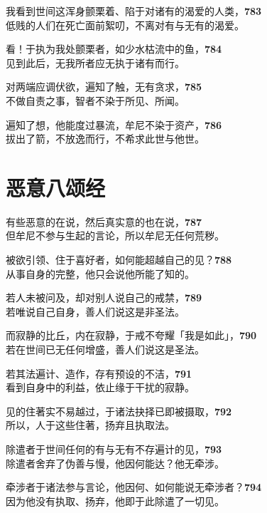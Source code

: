 我看到世间这浑身颤栗着、陷于对诸有的渴爱的人类，\hfill{\grayfootnotesize \textbf{783}} \\
低贱的人们在死亡面前絮叨，不离对有与无有的渴爱。


看！于执为我处颤栗者，如少水枯流中的鱼，\hfill{\grayfootnotesize \textbf{784}} \\
见到此后，无我所者应无执于诸有而行。


对两端应调伏欲，遍知了触，无有贪求，\hfill{\grayfootnotesize \textbf{785}} \\
不做自责之事，智者不染于所见、所闻。


遍知了想，他能度过暴流，牟尼不染于资产，\hfill{\grayfootnotesize \textbf{786}} \\
拔出了箭，不放逸而行，不希求此世与他世。


\section{恶意八颂经}

有些恶意的在说，然后真实意的也在说，\hfill{\grayfootnotesize \textbf{787}} \\
但牟尼不参与生起的言论，所以牟尼无任何荒秽。


被欲引领、住于喜好者，如何能超越自己的见？\hfill{\grayfootnotesize \textbf{788}} \\
从事自身的完整，他只会说他所能了知的。


若人未被问及，却对别人说自己的戒禁，\hfill{\grayfootnotesize \textbf{789}} \\
若唯说自己自身，善人们说这是非圣法。


而寂静的比丘，内在寂静，于戒不夸耀「我是如此」，\hfill{\grayfootnotesize \textbf{790}} \\
若在世间已无任何增盛，善人们说这是圣法。


若其法遍计、造作，存有预设的不洁，\hfill{\grayfootnotesize \textbf{791}} \\
看到自身中的利益，依止缘于干扰的寂静。


见的住著实不易越过，于诸法抉择已即被摄取，\hfill{\grayfootnotesize \textbf{792}} \\
所以，人于这些住著，扬弃且执取法。


除遣者于世间任何的有与无有不存遍计的见，\hfill{\grayfootnotesize \textbf{793}} \\
除遣者舍弃了伪善与慢，他因何能达？他无牵涉。


牵涉者于诸法参与言论，他因何、如何能说无牵涉者？\hfill{\grayfootnotesize \textbf{794}} \\
因为他没有执取、扬弃，他即于此除遣了一切见。


